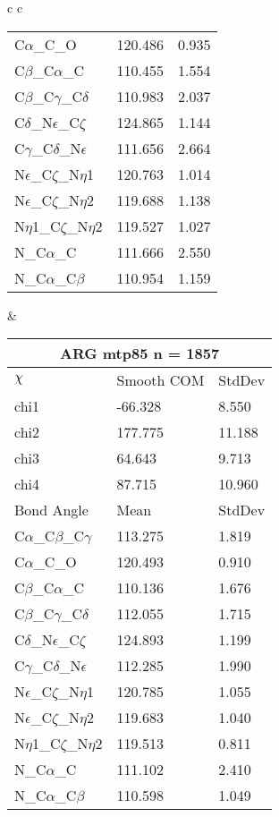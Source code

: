 \begin{longtable}{ c c }
\begin{tabular}{ l l l }
  C$\alpha$\_C\_O & 120.486 & 0.935\\
  C$\beta$\_C$\alpha$\_C & 110.455 & 1.554\\
  C$\beta$\_C$\gamma$\_C$\delta$ & 110.983 & 2.037\\
  C$\delta$\_N$\epsilon$\_C$\zeta$ & 124.865 & 1.144\\
  C$\gamma$\_C$\delta$\_N$\epsilon$ & 111.656 & 2.664\\
  N$\epsilon$\_C$\zeta$\_N$\eta$1 & 120.763 & 1.014\\
  N$\epsilon$\_C$\zeta$\_N$\eta$2 & 119.688 & 1.138\\
  N$\eta$1\_C$\zeta$\_N$\eta$2 & 119.527 & 1.027\\
  N\_C$\alpha$\_C & 111.666 & 2.550\\
  N\_C$\alpha$\_C$\beta$ & 110.954 & 1.159\\
  \bottomrule
  \end{tabular}
  &
  \begin{tabular}{ l l l }
  \toprule
  \multicolumn{3}{c}{ARG \textbf{mtp85} n = 1857} \\ \toprule
  $\chi$       & Smooth COM & StdDev \\ \midrule
  chi1 & -66.328 & 8.550 \\ 
  chi2 & 177.775 & 11.188 \\ 
  chi3 & 64.643 & 9.713 \\ 
  chi4 & 87.715 & 10.960 \\ \midrule
  Bond Angle   & Mean     & StdDev \\ \midrule
  C$\alpha$\_C$\beta$\_C$\gamma$ & 113.275 & 1.819\\
  C$\alpha$\_C\_O & 120.493 & 0.910\\
  C$\beta$\_C$\alpha$\_C & 110.136 & 1.676\\
  C$\beta$\_C$\gamma$\_C$\delta$ & 112.055 & 1.715\\
  C$\delta$\_N$\epsilon$\_C$\zeta$ & 124.893 & 1.199\\
  C$\gamma$\_C$\delta$\_N$\epsilon$ & 112.285 & 1.990\\
  N$\epsilon$\_C$\zeta$\_N$\eta$1 & 120.785 & 1.055\\
  N$\epsilon$\_C$\zeta$\_N$\eta$2 & 119.683 & 1.040\\
  N$\eta$1\_C$\zeta$\_N$\eta$2 & 119.513 & 0.811\\
  N\_C$\alpha$\_C & 111.102 & 2.410\\
  N\_C$\alpha$\_C$\beta$ & 110.598 & 1.049\\
  \bottomrule
  \end{tabular}

\end{longtable}
